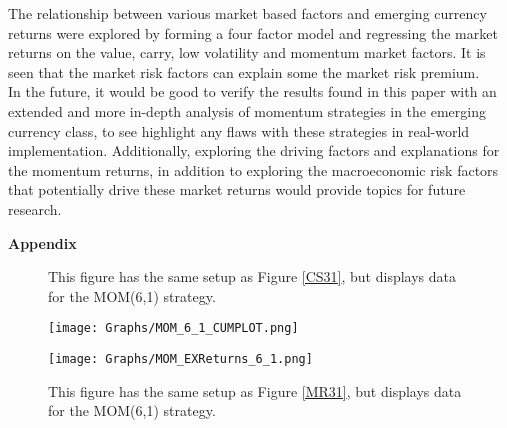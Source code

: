 \documentclass{article}
\begin{document}
The relationship between various market based factors and emerging currency returns were explored by forming a four factor model and regressing the market returns on the value, carry, low volatility and momentum market factors. It is seen that the market risk factors can explain some the market risk premium. \\

In the future, it would be good to verify the results found in this paper with an extended and more in-depth analysis of momentum strategies in the emerging currency class, to see highlight any flaws with these strategies in real-world implementation. Additionally, exploring the driving factors and explanations for the momentum returns, in addition to exploring the macroeconomic risk factors that potentially drive these market returns would provide topics for future research.

\newpage



\nocite{asness2013value}
\nocite{jegadeesh2011momentum}
\nocite{jegadeesh2001profitability}
\nocite{conrad1998anatomy}
\nocite{grobystextordfeminine1currency}
\nocite{menkhoff2012currency}
\nocite{menkhoff2012carry}
\nocite{moskowitz2012time}
\nocite{okunev2003momentum}
\nocite{asness2014fact}
\nocite{rouwenhorst1998international}
\nocite{hurst2017century}
\nocite{geczy2017two}
\nocite{asness2013value}
\nocite{filippou2018global}
\nocite{hu2021emerging}
\nocite{lustig2011common}
\nocite{taylor1995economics}
\nocite{sarno2003economics}
\nocite{baku2019factor}
\nocite{neely2011technical}
\nocite{taylor1992use}
\nocite{menkhoff2012carry}
\nocite{chong2009momentum}
\nocite{tajaddini2012momentum}
\nocite{zhuang2018improving}
\nocite{reinhart2004modern}

\newpage


\appendix
\LARGE{\textbf{Appendix}}
\begin{figure}[hp]
    \centering

    \begin{minipage}{1\textwidth}
    \centering
    \caption{This figure has the same setup as Figure \ref{CS31}, but displays data for the MOM(6,1) strategy.}
    \begin{adjustwidth}{-0.25cm}{}
    \texttt{[image: Graphs/MOM\_6\_1\_CUMPLOT.png]}
    \end{adjustwidth}
    \label{CS61}
    \end{minipage}

    \begin{minipage}{1\textwidth}
    \centering
    \caption{This figure has the same setup as Figure \ref{MR31}, but displays data for the MOM(6,1) strategy.}
    \begin{adjustwidth}{-0.5cm}{}
    \texttt{[image: Graphs/MOM\_EXReturns\_6\_1.png]}
    \end{adjustwidth}
    \label{MR61}
    \end{minipage}
\end{figure}
\end{document}

